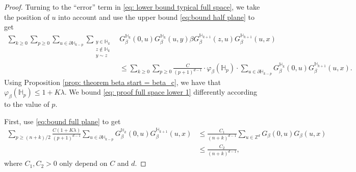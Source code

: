 \documentclass[11pt,a4paper]{article}
\numberwithin{equation}{section}
\theoremstyle{plain}
\theoremstyle{definition}
\begin{document}
\begin{proof}
Turning to the ``error'' term in \eqref{eq: lower bound typical full space}, we take the position of $u$ into account and use the upper bound \eqref{eq:bound half plane} to get 
\begin{align}
		\sum_{k\geq 0}\sum_{p\geq 0}\sum_{u\in \partial \mathbb H_{k-p}}\sum_{\substack{y\in \mathbb H_k\\z\notin \mathbb H_k\\y\sim z}} &G_\beta^{\mathbb H_k}(0,u)G_\beta^{\mathbb H_k}(u,y)\beta G_\beta^{\mathbb H_{k+1}}(z,u)G_\beta^{\mathbb H_{k+1}}(u,x)\nonumber
		\\&\leq \sum_{k\geq 0}\sum_{p\geq 0}\frac{C}{(p+1)^{d-1}}\cdot \varphi_\beta(\mathbb H_p)\cdot \sum_{u\in \partial \mathbb H_{k-p}}G_\beta^{\mathbb H_k}(0,u)G_\beta^{\mathbb H_{k+1}}(u,x).\label{eq: proof full space lower 1}
		\end{align}
Using Proposition \ref{prop: theorem beta start = beta_c}, we have that $\varphi_\beta(\mathbb H_p)\leq 1+K\lambda$. We bound \eqref{eq: proof full space lower 1} differently according to the value of $p$. 

First, use \eqref{eq:bound full plane} to get
\begin{align}
	\sum_{p\geq (n+k)/2}\frac{C(1+K\lambda)}{(p+1)^{d-1}}\sum_{u\in \partial \mathbb H_{k-p}}G_\beta^{\mathbb H_k}(0,u)G_\beta^{\mathbb H_{k+1}}(u,x)&\leq \frac{C_1}{(n+k)^{d-1}}\sum_{u\in \mathbb Z^d}G_{\beta}(0,u)G_{\beta}(u,x)
	\\&\leq \frac{C_2}{(n+k)^{d-1}},\label{eq: proof full space lower 2}
\end{align} where $C_1,C_2>0$ only depend on $C$ and $d$.
%


\end{proof}
\end{document}
